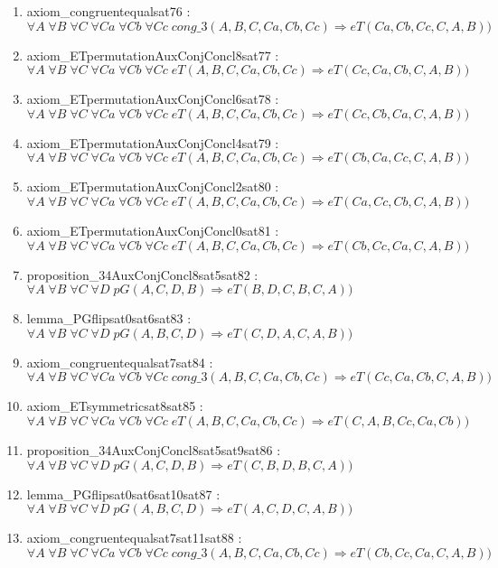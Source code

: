 \documentclass{article}
\begin{document}
\begin{enumerate}
\item axiom\_congruentequalsat76 : $\forall A\;\forall B\;\forall C\;\forall Ca\;\forall Cb\;\forall Cc\;cong\_3(A, B, C, Ca, Cb, Cc) \Rightarrow eT(Ca, Cb, Cc, C, A, B))$
\item axiom\_ETpermutationAuxConjConcl8sat77 : $\forall A\;\forall B\;\forall C\;\forall Ca\;\forall Cb\;\forall Cc\;eT(A, B, C, Ca, Cb, Cc) \Rightarrow eT(Cc, Ca, Cb, C, A, B))$
\item axiom\_ETpermutationAuxConjConcl6sat78 : $\forall A\;\forall B\;\forall C\;\forall Ca\;\forall Cb\;\forall Cc\;eT(A, B, C, Ca, Cb, Cc) \Rightarrow eT(Cc, Cb, Ca, C, A, B))$
\item axiom\_ETpermutationAuxConjConcl4sat79 : $\forall A\;\forall B\;\forall C\;\forall Ca\;\forall Cb\;\forall Cc\;eT(A, B, C, Ca, Cb, Cc) \Rightarrow eT(Cb, Ca, Cc, C, A, B))$
\item axiom\_ETpermutationAuxConjConcl2sat80 : $\forall A\;\forall B\;\forall C\;\forall Ca\;\forall Cb\;\forall Cc\;eT(A, B, C, Ca, Cb, Cc) \Rightarrow eT(Ca, Cc, Cb, C, A, B))$
\item axiom\_ETpermutationAuxConjConcl0sat81 : $\forall A\;\forall B\;\forall C\;\forall Ca\;\forall Cb\;\forall Cc\;eT(A, B, C, Ca, Cb, Cc) \Rightarrow eT(Cb, Cc, Ca, C, A, B))$
\item proposition\_34AuxConjConcl8sat5sat82 : $\forall A\;\forall B\;\forall C\;\forall D\;pG(A, C, D, B) \Rightarrow eT(B, D, C, B, C, A))$
\item lemma\_PGflipsat0sat6sat83 : $\forall A\;\forall B\;\forall C\;\forall D\;pG(A, B, C, D) \Rightarrow eT(C, D, A, C, A, B))$
\item axiom\_congruentequalsat7sat84 : $\forall A\;\forall B\;\forall C\;\forall Ca\;\forall Cb\;\forall Cc\;cong\_3(A, B, C, Ca, Cb, Cc) \Rightarrow eT(Cc, Ca, Cb, C, A, B))$
\item axiom\_ETsymmetricsat8sat85 : $\forall A\;\forall B\;\forall C\;\forall Ca\;\forall Cb\;\forall Cc\;eT(A, B, C, Ca, Cb, Cc) \Rightarrow eT(C, A, B, Cc, Ca, Cb))$
\item proposition\_34AuxConjConcl8sat5sat9sat86 : $\forall A\;\forall B\;\forall C\;\forall D\;pG(A, C, D, B) \Rightarrow eT(C, B, D, B, C, A))$
\item lemma\_PGflipsat0sat6sat10sat87 : $\forall A\;\forall B\;\forall C\;\forall D\;pG(A, B, C, D) \Rightarrow eT(A, C, D, C, A, B))$
\item axiom\_congruentequalsat7sat11sat88 : $\forall A\;\forall B\;\forall C\;\forall Ca\;\forall Cb\;\forall Cc\;cong\_3(A, B, C, Ca, Cb, Cc) \Rightarrow eT(Cb, Cc, Ca, C, A, B))$

\end{enumerate}
\end{document}
